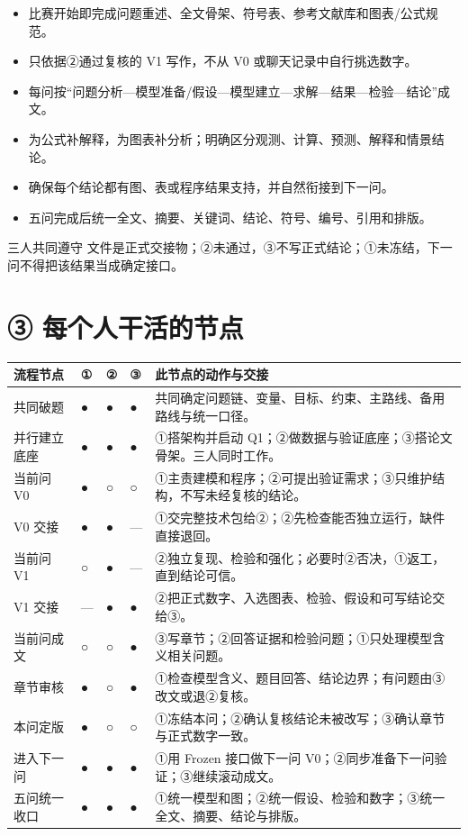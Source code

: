 \documentclass[11pt,a4paper]{ctexart}
\begin{document}
\begin{tcolorbox}[colback=purplebg,colframe=purple,title={③ 论文主笔与结构负责人｜组织、成文、追证、整合},fonttitle=\bfseries,boxrule=1pt,arc=2mm]
\begin{itemize}
  \item 比赛开始即完成问题重述、全文骨架、符号表、参考文献库和图表/公式规范。
  \item 只依据②通过复核的 V1 写作，不从 V0 或聊天记录中自行挑选数字。
  \item 每问按“问题分析—模型准备/假设—模型建立—求解—结果—检验—结论”成文。
  \item 为公式补解释，为图表补分析；明确区分观测、计算、预测、解释和情景结论。
  \item 确保每个结论都有图、表或程序结果支持，并自然衔接到下一问。
  \item 五问完成后统一全文、摘要、关键词、结论、符号、编号、引用和排版。
\end{itemize}
\end{tcolorbox}

\begin{redbox}{三人共同遵守}
文件是正式交接物；②未通过，③不写正式结论；①未冻结，下一问不得把该结果当成确定接口。
\end{redbox}

\clearpage
\section*{③ 每个人干活的节点}

\begin{center}
\small
\begin{tabularx}{\textwidth}{@{}p{2.7cm}C{1.2cm}C{1.2cm}C{1.2cm}Y@{}}
\toprule
流程节点 & ① & ② & ③ & 此节点的动作与交接\\
\midrule
共同破题 & ● & ● & ● & 共同确定问题链、变量、目标、约束、主路线、备用路线与统一口径。\\
并行建立底座 & ● & ● & ● & ①搭架构并启动 Q1；②做数据与验证底座；③搭论文骨架。三人同时工作。\\
当前问 V0 & ● & ○ & ○ & ①主责建模和程序；②可提出验证需求；③只维护结构，不写未经复核的结论。\\
V0 交接 & ● & ● & — & ①交完整技术包给②；②先检查能否独立运行，缺件直接退回。\\
当前问 V1 & ○ & ● & — & ②独立复现、检验和强化；必要时②否决，①返工，直到结论可信。\\
V1 交接 & — & ● & ● & ②把正式数字、入选图表、检验、假设和可写结论交给③。\\
当前问成文 & ○ & ○ & ● & ③写章节；②回答证据和检验问题；①只处理模型含义相关问题。\\
章节审核 & ● & ○ & ● & ①检查模型含义、题目回答、结论边界；有问题由③改文或退②复核。\\
本问定版 & ● & ○ & ○ & ①冻结本问；②确认复核结论未被改写；③确认章节与正式数字一致。\\
进入下一问 & ● & ● & ● & ①用 Frozen 接口做下一问 V0；②同步准备下一问验证；③继续滚动成文。\\
五问统一收口 & ● & ● & ● & ①统一模型和图；②统一假设、检验和数字；③统一全文、摘要、结论与排版。\\
\bottomrule
\end{tabularx}
\end{center}
\end{document}
